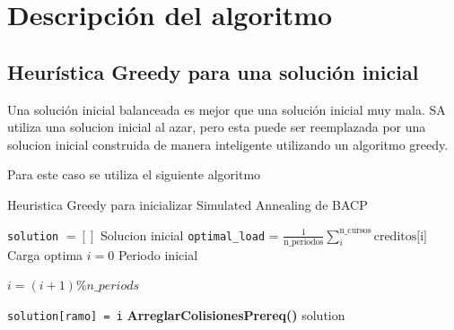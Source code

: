 \documentclass[letterpaper,10pt]{article}
\begin{document}
\section{Descripción del algoritmo}


\subsection{Heurística Greedy para una solución inicial}

Una solución inicial balanceada es mejor que una solución inicial muy mala. SA utiliza una solucion inicial al azar, pero esta puede ser reemplazada por una solucion inicial construida de manera inteligente utilizando un algoritmo greedy.

Para este caso se utiliza el siguiente algoritmo

\begin{algorithm}[H]
\caption{Heuristica Greedy para inicializar Simulated Annealing de BACP}
\label{GreedyHeuristic}
\begin{algorithmic}[1]
 {}
    \State \texttt{solution} $=[]$ Solucion inicial
    \State \texttt{optimal\_load} = $\frac{1}{\text{n\_periodos}}\sum_{i}^{\text{n\_cursos}} \text{creditos[i]}$ \quad Carga optima
    \State $i = 0$ Periodo inicial

        \State $i = (i + 1) \% n\_periods $
      \EndIf

      \State \texttt{solution[ramo] = i}
      \State \textbf{ArreglarColisionesPrereq()}
    \EndFor
    \State \Return solution
\EndProcedure
\end{algorithmic}
\end{algorithm}
\end{document}
